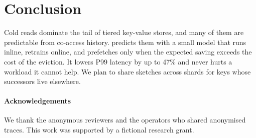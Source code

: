 \documentclass[10pt, twocolumn]{article}
\begin{document}
\section{Conclusion}

Cold reads dominate the tail of tiered key-value stores, and many of them
are predictable from co-access history. \sys{} predicts them with
a small model that runs inline, retrains online, and prefetches only when
the expected saving exceeds the cost of the eviction. It lowers P99 latency
by up to 47\% and never hurts a workload it cannot help. We plan to share
sketches across shards for keys whose successors live elsewhere.

\paragraph{Acknowledgements}
We thank the anonymous reviewers and the operators who shared anonymised
traces. This work was supported by a fictional research grant.

\printbibliography
\end{document}
